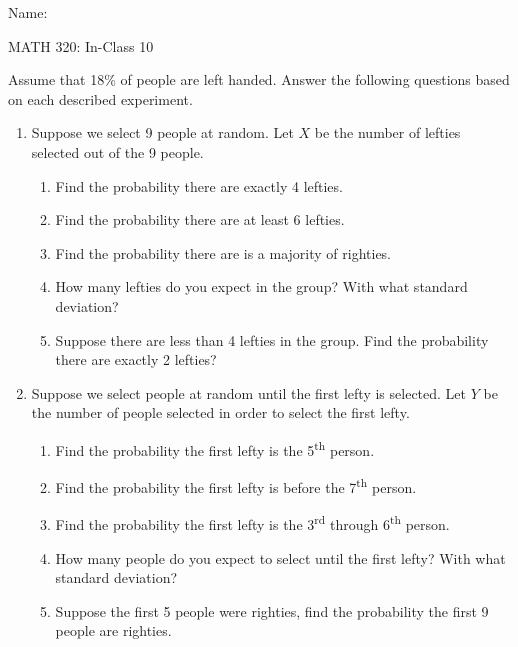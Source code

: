 \documentclass{article}
\begin{document}
\hspace{375pt}Name:

\begin{center}
{\Huge MATH 320: In-Class 10}

\end{center}
\bigskip\bigskip

Assume that 18\% of people are left handed. Answer the following questions based on each described experiment.\bigskip
\begin{enumerate}
    \item Suppose we select 9 people at random. Let $X$ be the number of lefties selected out of the 9 people.\bigskip
    \begin{enumerate}
        \item Find the probability there are exactly 4 lefties.\vspace{80pt}%
        \item Find the probability there are at least 6 lefties.\vspace{80pt}%
        \item Find the probability there are is a majority of righties.\vspace{80pt}%
        \item How many lefties do you expect in the group? With what standard deviation?\vspace{80pt}%
        \item Suppose there are less than 4 lefties in the group. Find the probability there are exactly 2 lefties?\vspace{80pt}%
    \end{enumerate}\newpage
    
    \item Suppose we select people at random until the first lefty is selected. Let $Y$ be the number of people selected in order to select the first lefty.\bigskip
    \begin{enumerate}
        \item Find the probability the first lefty is the 5\textsuperscript{th} person.\vspace{80pt}%
        \item Find the probability the first lefty is before the 7\textsuperscript{th} person.\vspace{80pt}%
        \item Find the probability the first lefty is the 3\textsuperscript{rd} through  6\textsuperscript{th} person.\vspace{80pt}%
        \item How many people do you expect to select until the first lefty? With what standard deviation?\vspace{80pt}%
        \item Suppose the first 5 people were righties, find the probability the first 9 people are righties.\vspace{80pt}%
    \end{enumerate}
\end{enumerate}
\end{document}
